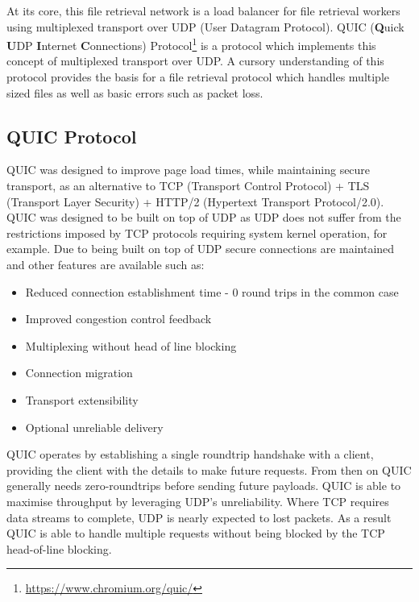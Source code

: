 \documentclass{article}
\begin{document}
At its core, this file retrieval network is a load balancer for file retrieval workers using multiplexed transport over UDP (User Datagram Protocol). QUIC ({\bf Q}uick {\bf U}DP {\bf I}nternet {\bf C}onnections) Protocol\footnote[1]{\href{https://www.chromium.org/quic/}{https://www.chromium.org/quic/}} is a protocol which implements this concept of multiplexed transport over UDP. A cursory understanding of this protocol provides the basis for a file retrieval protocol which handles multiple sized files as well as basic errors such as packet loss.


\subsection{QUIC Protocol}

QUIC was designed to improve page load times, while maintaining secure transport, as an alternative to TCP (Transport Control Protocol) + TLS (Transport Layer Security) + HTTP/2 (Hypertext Transport Protocol/2.0). QUIC was designed to be built on top of UDP as UDP does not suffer from the restrictions imposed by TCP protocols requiring system kernel operation, for example. Due to being built on top of UDP secure connections are maintained and other features are available such as:
\begin{itemize}
	\item Reduced connection establishment time - 0 round trips in the common case
	\item Improved congestion control feedback
	\item Multiplexing without head of line blocking
	\item Connection migration
	\item Transport extensibility
	\item Optional unreliable delivery \cite{QUIC}
\end{itemize}

QUIC operates by establishing a single roundtrip handshake with a client, providing the client with the details to make future requests. From then on QUIC generally needs zero-roundtrips before sending future payloads. QUIC is able to maximise throughput by leveraging UDP's unreliability. Where TCP requires data streams to complete, UDP is nearly expected to lost packets. As a result QUIC is able to handle multiple requests without being blocked by the TCP head-of-line blocking. \cite{QUIC_RFC}

\end{document}
